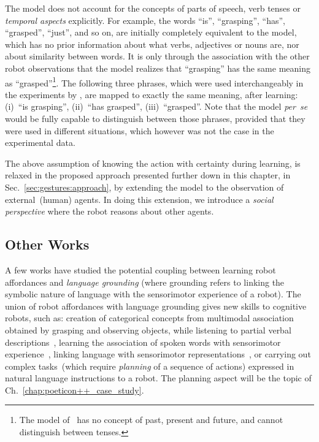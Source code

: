 The \AffWords{} model does not account for the concepts of parts of speech, verb tenses or \emph{temporal aspects} explicitly.
For example, the words ``is'', ``grasping'', ``has'', ``grasped'', ``just'', and so on, are initially completely equivalent to the model, which has no prior information about what verbs, adjectives or nouns are, nor about similarity between words.
It is only through the association with the other robot observations that the model realizes that ``grasping'' has the same meaning as ``grasped''\footnote{The model of~\cite{salvi:2012:smcb} has no concept of past, present and future, and cannot distinguish between tenses.}.
The following three phrases, which were used interchangeably in the experiments by \cite{salvi:2012:smcb}, are mapped to exactly the same meaning, after learning:
(i)~``is grasping'',
(ii)~``has grasped'',
(iii)~``grasped''.
Note that the model \emph{per~se} would be fully capable to distinguish between those phrases, provided that they were used in different situations, which however was not the case in the experimental data.

The above assumption
of knowing the action with certainty during learning,
is relaxed in the proposed approach presented further down in this chapter, in Sec.~\ref{sec:gestures:approach}, by extending the model to the observation of external~(human) agents.
In doing this extension, we introduce a \emph{social perspective} where the robot reasons about other agents.

\subsection{Other Works}
\label{sec:gestures:related:other}

A few works have studied the potential coupling between learning robot affordances and \emph{language grounding} (where grounding refers to linking the symbolic nature of language with the sensorimotor experience of a robot).
The union of robot affordances with language grounding gives new skills to cognitive robots, such as:
creation of categorical concepts from multimodal association obtained by grasping and observing objects, while listening to partial verbal descriptions~\cite{nakamura:2009:iros,araki:2012:iros},
learning the association of spoken words with sensorimotor experience~\cite{morse:2016:cogsci}, linking language with sensorimotor representations~\cite{stramandinoli:2016:icdl}, or carrying out complex tasks~(which require \emph{planning} of a sequence of actions) expressed in natural language instructions to a robot.
The planning aspect will be the topic of Ch.~\ref{chap:poeticon++_case_study}.


